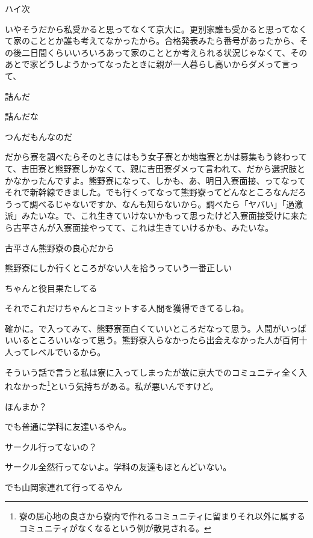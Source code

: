 \begin{multicols}{3}
ハイ次

いやそうだから私受かると思ってなくて京大に。更別家誰も受かると思ってなくて家のこととか誰も考えてなかったから。合格発表みたら番号があったから、その後二日間くらいいろいろあって家のこととか考えられる状況じゃなくて、そのあとで家どうしようかってなったときに親が一人暮らし高いからダメって言って、

詰んだ

詰んだな

つんだもんなのだ

だから寮を調べたらそのときにはもう女子寮とか地塩寮とかは募集もう終わってて、吉田寮と熊野寮しかなくて、親に吉田寮ダメって言われて、だから選択肢とかなかったんですよ。熊野寮になって、しかも、あ、明日入寮面接、ってなってそれで新幹線できました。でも行くってなって熊野寮ってどんなところなんだろうって調べるじゃないですか、なんも知らないから。調べたら「ヤバい」「過激派」みたいな。で、これ生きていけないかもって思ったけど入寮面接受けに来たら古平さんが入寮面接やってて、これは生きていけるかも、みたいな。

古平さん熊野寮の良心だから

熊野寮にしか行くところがない人を拾うっていう一番正しい

ちゃんと役目果たしてる

それでこれだけちゃんとコミットする人間を獲得できてるしね。

確かに。で入ってみて、熊野寮面白くていいところだなって思う。人間がいっぱいいるところいいなって思う。熊野寮入らなかったら出会えなかった人が百何十人ってレベルでいるから。

\vspace{5mm}


\noindent{}

そういう話で言うと私は寮に入ってしまったが故に京大でのコミュニティ全く入れなかった\footnote{寮の居心地の良さから寮内で作れるコミュニティに留まりそれ以外に属するコミュニティがなくなるという例が散見される。}という気持ちがある。私が悪いんですけど。

ほんまか？

でも普通に学科に友達いるやん。

サークル行ってないの？

サークル全然行ってないよ。学科の友達もほとんどいない。

でも山岡家連れて行ってるやん


\end{multicols}
